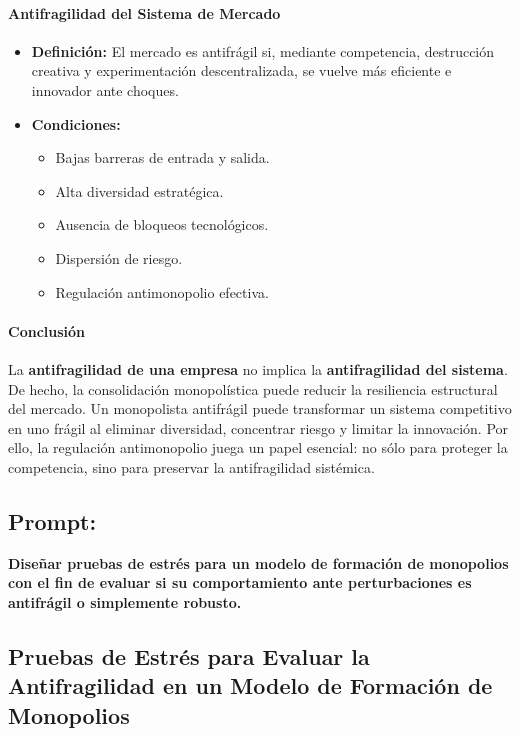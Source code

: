 \documentclass[a4paper,12pt]{article}
\begin{document}
\paragraph{Antifragilidad del Sistema de Mercado}

\begin{itemize}
    \item \textbf{Definición:} El mercado es antifrágil si, mediante competencia, destrucción creativa y experimentación descentralizada, se vuelve más eficiente e innovador ante choques.

    \item \textbf{Condiciones:}
    \begin{itemize}
        \item Bajas barreras de entrada y salida.
        \item Alta diversidad estratégica.
        \item Ausencia de bloqueos tecnológicos.
        \item Dispersión de riesgo.
        \item Regulación antimonopolio efectiva.
    \end{itemize}
\end{itemize}

\paragraph{Conclusión}

La \textbf{antifragilidad de una empresa} no implica la \textbf{antifragilidad del sistema}. De hecho, la consolidación monopolística puede reducir la resiliencia estructural del mercado. Un monopolista antifrágil puede transformar un sistema competitivo en uno frágil al eliminar diversidad, concentrar riesgo y limitar la innovación. Por ello, la regulación antimonopolio juega un papel esencial: no sólo para proteger la competencia, sino para preservar la antifragilidad sistémica.


\subsection*{Prompt:}
\textbf{Diseñar pruebas de estrés para un modelo de formación de monopolios con el fin de evaluar si su comportamiento ante perturbaciones es antifrágil o simplemente robusto.}

\subsection*{Pruebas de Estrés para Evaluar la Antifragilidad en un Modelo de Formación de Monopolios}
\end{document}
